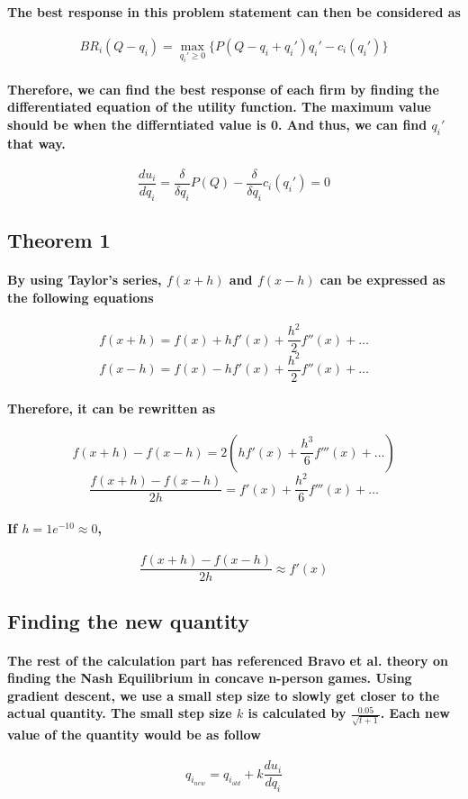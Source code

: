 \documentclass[11pt]{report}
\begin{document}
\paragraph{The best response in this problem statement can then be considered as }
\[BR_i(Q-q_i) = \max_{q_i' \geq 0}\{P(Q-q_i+q_i')q_i'-c_i(q_i')\}\]
\paragraph{Therefore, we can find the best response of each firm by finding the differentiated equation of the utility function. The maximum value should be when the differntiated value is 0. And thus, we can find $q_i'$ that way. }

\[\frac{du_i}{dq_i}=\frac{\delta}{\delta q_i}P(Q)-\frac{\delta}{\delta q_i}c_i(q_i') = 0\]

\subsection{Theorem 1}
\paragraph{By using Taylor's series, $f(x+h)$ and $f(x-h)$ can be expressed as the following equations \cite{rudin1967principles}}
\[f(x+h)=f(x) + hf'(x) + \frac{h^2}{2}f''(x) + \dots\]
\[f(x-h) = f(x) -hf'(x)+\frac{h^2}{2}f''(x)+\dots \]

\paragraph{Therefore, it can be rewritten as}
\[f(x+h)-f(x-h)=2(hf'(x)+\frac{h^3}{6}f'''(x)+\dots)\]
\[\frac{f(x+h)-f(x-h)}{2h}=f'(x) +\frac{h^2}{6}f'''(x)+\dots\]

\paragraph{If $h=1e^{-10}\approx0$, }

\[\frac{f(x+h)-f(x-h)}{2h}\approx f'(x)\]

\subsection{Finding the new quantity}

\paragraph{The rest of the calculation part has referenced Bravo et al. \cite{bravo2018bandit} theory on finding the Nash Equilibrium in concave n-person games. Using gradient descent, we use a small step size to slowly get closer to the actual quantity. The small step size $k$ is calculated by $\frac{0.05}{\sqrt{t+1}}$. Each new value of the quantity would be as follow}
\[q_{i_{new}}=q_{i_{old}}+k \frac{du_i}{dq_i}\]
\end{document}
